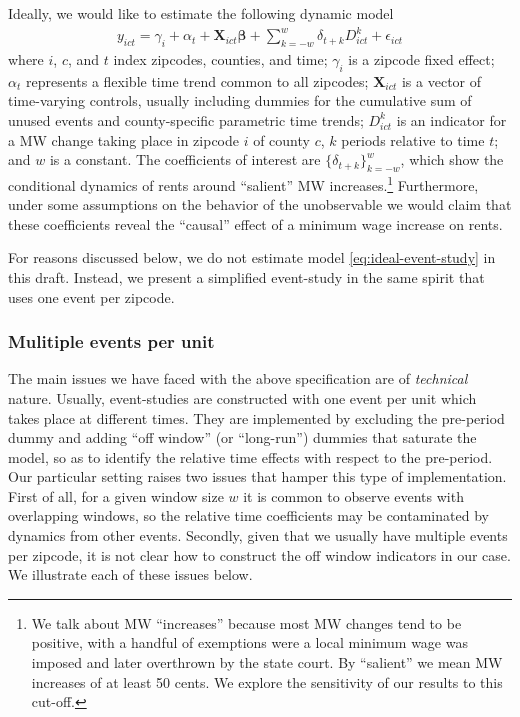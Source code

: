     Ideally, we would like to estimate the following dynamic model
    \begin{equation}\label{eq:ideal-event-study}
        \begin{split}
            y_{ict} = \gamma_{i} + \alpha_{t} + \boldsymbol{X}_{ict} \boldsymbol{\beta} + \sum_{k = -w}^{w}\delta_{t + k} D_{ict}^k + \epsilon_{ict}
        \end{split}   
    \end{equation}
    where $i$, $c$, and $t$ index zipcodes, counties, and time; $\gamma_{i}$ is a zipcode fixed effect; $\alpha_{t}$ represents a flexible time trend common to all zipcodes; $\boldsymbol{X}_{ict}$ is a vector of time-varying controls, usually including dummies for the cumulative sum of unused events and county-specific parametric time trends; $D_{ict}^k$ is an indicator for a MW change taking place in zipcode $i$ of county $c$, $k$ periods relative to time $t$; and $w$ is a constant. The coefficients of interest are $\{\delta_{t + k}\}_{k=-w}^w$, which show the conditional dynamics of rents around ``salient'' MW increases.\footnote{We talk about MW ``increases'' because most MW changes tend to be positive, with a handful of exemptions were a local minimum wage was imposed and later overthrown by the state court. By ``salient'' we mean MW increases of at least 50 cents. We explore the sensitivity of our results to this cut-off.} Furthermore, under some assumptions on the behavior of the unobservable we would claim that these coefficients reveal the ``causal'' effect of a minimum wage increase on rents.

    For reasons discussed below, we do not estimate model \eqref{eq:ideal-event-study} in this draft. Instead, we present a simplified event-study in the same spirit that uses one event per zipcode.

\subsubsection{Mulitiple events per unit}

    The main issues we have faced with the above specification are of \textit{technical} nature. Usually, event-studies are constructed with one event per unit which takes place at different times. They are implemented by excluding the pre-period dummy and adding ``off window'' (or ``long-run'') dummies that saturate the model, so as to identify the relative time effects with respect to the pre-period. Our particular setting raises two issues that hamper this type of implementation. First of all, for a given window size $w$ it is common to observe events with overlapping windows, so the relative time coefficients may be contaminated by dynamics from other events. Secondly, given that we usually have multiple events per zipcode, it is not clear how to construct the off window indicators in our case. We illustrate each of these issues below.
    
